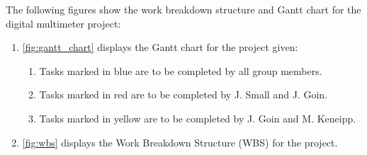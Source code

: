 \documentclass{article}
\begin{document}
    \maketitle
    The following figures show the work breakdown structure and Gantt chart for the digital multimeter project:
    \begin{enumerate}
        \item \autoref{fig:gantt_chart} displays the Gantt chart for the project given:
        \begin{enumerate}
            \item Tasks marked in blue are to be completed by all group members.
            \item Tasks marked in red are to be completed by J. Small and J. Goin.
            \item Tasks marked in yellow are to be completed by J. Goin and M. Keneipp.
        \end{enumerate}
        \item \autoref{fig:wbs} displays the Work Breakdown Structure (WBS) for the project.
    \end{enumerate}
    
    
\end{document}
